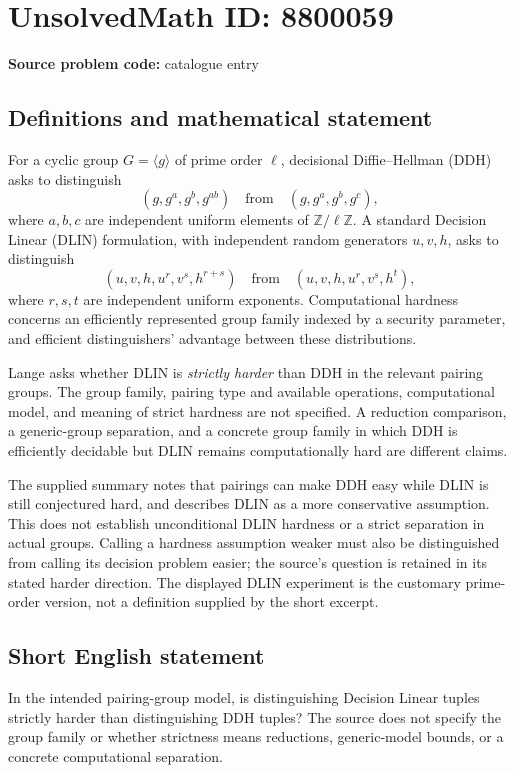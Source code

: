 \documentclass[11pt]{article}
\newcommand{\Z}{\mathbb{Z}}
\begin{document}
\section*{UnsolvedMath ID: 8800059}
\textbf{Source problem code:} catalogue entry
\subsection{Definitions and mathematical statement}
For a cyclic group \(G=\langle g\rangle\) of prime order \(\ell\), decisional Diffie--Hellman (DDH) asks to distinguish
\[
 (g,g^a,g^b,g^{ab})\quad\text{from}\quad(g,g^a,g^b,g^c),
\]
where \(a,b,c\) are independent uniform elements of \(\Z/\ell\Z\). A standard Decision Linear (DLIN) formulation, with independent random generators \(u,v,h\), asks to distinguish
\[
 (u,v,h,u^r,v^s,h^{r+s})\quad\text{from}\quad
 (u,v,h,u^r,v^s,h^t),
\]
where \(r,s,t\) are independent uniform exponents. Computational hardness concerns an efficiently represented group family indexed by a security parameter, and efficient distinguishers' advantage between these distributions.

Lange asks whether DLIN is \emph{strictly harder} than DDH in the relevant pairing groups. The group family, pairing type and available operations, computational model, and meaning of strict hardness are not specified. A reduction comparison, a generic-group separation, and a concrete group family in which DDH is efficiently decidable but DLIN remains computationally hard are different claims.

The supplied summary notes that pairings can make DDH easy while DLIN is still conjectured hard, and describes DLIN as a more conservative assumption. This does not establish unconditional DLIN hardness or a strict separation in actual groups. Calling a hardness assumption weaker must also be distinguished from calling its decision problem easier; the source's question is retained in its stated harder direction. The displayed DLIN experiment is the customary prime-order version, not a definition supplied by the short excerpt.
\subsection{Short English statement}
In the intended pairing-group model, is distinguishing Decision Linear tuples strictly harder than distinguishing DDH tuples? The source does not specify the group family or whether strictness means reductions, generic-model bounds, or a concrete computational separation.
\end{document}
